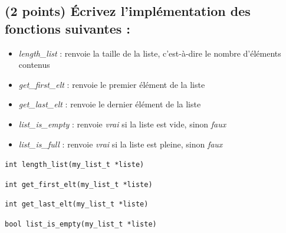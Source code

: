 \documentclass[11pt,a4paper]{article}
\begin{document}
\bigskip

\begin{center}
\end{center}

\bigskip

\subsection{(2 points) \'Ecrivez l'implémentation des fonctions suivantes : }

\begin{itemize}
\item \textit{length\_list} : renvoie la taille de la liste, c'est-à-dire le nombre d'éléments contenus
\item \textit{get\_first\_elt} : renvoie le premier élément de la liste
\item \textit{get\_last\_elt} : renvoie le dernier élément de la liste
\item \textit{list\_is\_empty} : renvoie \textit{vrai} si la liste est vide, sinon \textit{faux}
\item \textit{list\_is\_full} : renvoie \textit{vrai} si la liste est pleine, sinon \textit{faux}
\end{itemize}

\bigskip

\texttt{int length\_list(my\_list\_t *liste)}

\begin{center}
\end{center}


\vfillLast

\newpage

\vfillFirst

\texttt{int get\_first\_elt(my\_list\_t *liste)}

\begin{center}
\end{center}

\medskip

\texttt{int get\_last\_elt(my\_list\_t *liste)}

\begin{center}
\end{center}

\medskip

\texttt{bool list\_is\_empty(my\_list\_t *liste)}
\end{document}
